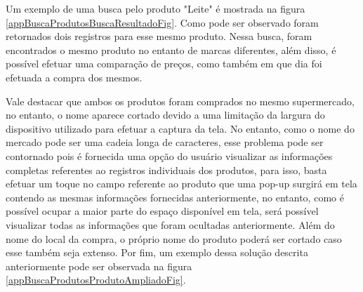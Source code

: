 Um exemplo de uma busca pelo produto "Leite" é mostrada na figura \ref{appBuscaProdutosBuscaResultadoFig}. Como pode ser observado foram retornados dois registros para esse mesmo produto. Nessa busca, foram encontrados o mesmo produto no entanto de marcas diferentes, além disso, é possível efetuar uma comparação de preços, como também em que dia foi efetuada a compra dos mesmos.

Vale destacar que ambos os produtos foram comprados no mesmo supermercado, no entanto, o nome aparece cortado devido a uma limitação da largura do dispositivo utilizado para efetuar a captura da tela. No entanto, como o nome do mercado pode ser uma cadeia longa de caracteres, esse problema pode ser contornado pois é fornecida uma opção do usuário visualizar as informações completas referentes ao registros individuais dos produtos, para isso, basta efetuar um toque no campo referente ao produto que uma pop-up surgirá em tela contendo as mesmas informações fornecidas anteriormente, no entanto, 
como é possível ocupar a maior parte do espaço disponível em tela, será possível visualizar todas as informações que foram ocultadas anteriormente. Além do nome do local da compra, o próprio nome do produto poderá ser cortado caso esse também seja extenso. Por fim, um exemplo dessa solução descrita anteriormente pode ser observada na figura \ref{appBuscaProdutosProdutoAmpliadoFig}.

